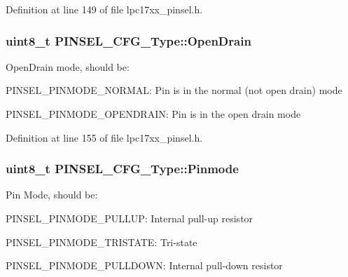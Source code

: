 \-Definition at line 149 of file lpc17xx\-\_\-pinsel.\-h.

\hypertarget{struct_p_i_n_s_e_l___c_f_g___type_af5bbd6b617833ebc7d0da0ed8b8fe595}{
\subsubsection[{\-Open\-Drain}]{\setlength{\rightskip}{0pt plus 5cm}uint8\-\_\-t {\bf \-P\-I\-N\-S\-E\-L\-\_\-\-C\-F\-G\-\_\-\-Type\-::\-Open\-Drain}}}\label{struct_p_i_n_s_e_l___c_f_g___type_af5bbd6b617833ebc7d0da0ed8b8fe595}
\-Open\-Drain mode, should be\-:
\begin{DoxyItemize}
\item \-P\-I\-N\-S\-E\-L\-\_\-\-P\-I\-N\-M\-O\-D\-E\-\_\-\-N\-O\-R\-M\-A\-L\-: \-Pin is in the normal (not open drain) mode
\item \-P\-I\-N\-S\-E\-L\-\_\-\-P\-I\-N\-M\-O\-D\-E\-\_\-\-O\-P\-E\-N\-D\-R\-A\-I\-N\-: \-Pin is in the open drain mode 
\end{DoxyItemize}

\-Definition at line 155 of file lpc17xx\-\_\-pinsel.\-h.

\hypertarget{struct_p_i_n_s_e_l___c_f_g___type_a04c559184af47bae47fd03f6e8430145}{
\subsubsection[{\-Pinmode}]{\setlength{\rightskip}{0pt plus 5cm}uint8\-\_\-t {\bf \-P\-I\-N\-S\-E\-L\-\_\-\-C\-F\-G\-\_\-\-Type\-::\-Pinmode}}}\label{struct_p_i_n_s_e_l___c_f_g___type_a04c559184af47bae47fd03f6e8430145}
\-Pin \-Mode, should be\-:
\begin{DoxyItemize}
\item \-P\-I\-N\-S\-E\-L\-\_\-\-P\-I\-N\-M\-O\-D\-E\-\_\-\-P\-U\-L\-L\-U\-P\-: \-Internal pull-\/up resistor
\item \-P\-I\-N\-S\-E\-L\-\_\-\-P\-I\-N\-M\-O\-D\-E\-\_\-\-T\-R\-I\-S\-T\-A\-T\-E\-: \-Tri-\/state
\item \-P\-I\-N\-S\-E\-L\-\_\-\-P\-I\-N\-M\-O\-D\-E\-\_\-\-P\-U\-L\-L\-D\-O\-W\-N\-: \-Internal pull-\/down resistor 
\end{DoxyItemize}

